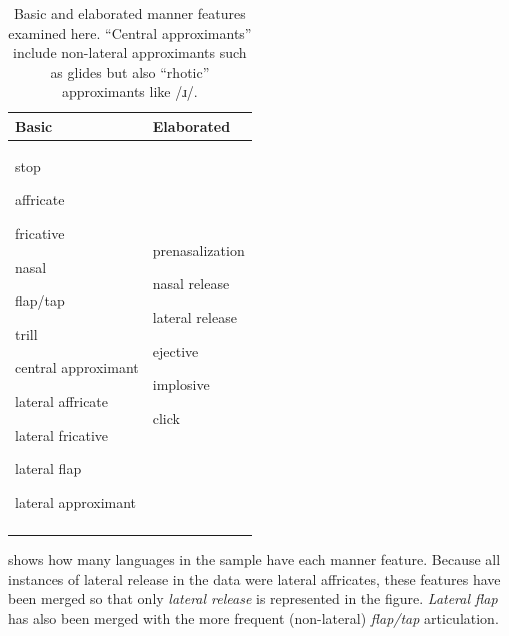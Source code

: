 \begin{table}
\begin{tabularx}{\textwidth}{QQ}
\lsptoprule
{Basic} & {Elaborated}\\\midrule
stop

affricate

fricative

nasal

flap/tap

trill

central approximant

lateral affricate

lateral fricative

lateral flap

lateral approximant & prenasalization

nasal release

lateral release

ejective

implosive

click\\
\lspbottomrule
\end{tabularx}
\caption{\label{tab:4.14}Basic and elaborated manner features examined here. ``Central approximants'' include non-lateral approximants such as glides but also ``rhotic'' approximants like /ɹ/.}
\end{table}

   shows how many languages in the sample have each manner feature. Because all instances of lateral release in the data were lateral affricates, these features have been merged so that only \textit{lateral release} is represented in the figure. \textit{Lateral flap} has also been merged with the more frequent (non-lateral) \textit{flap/tap} articulation.

